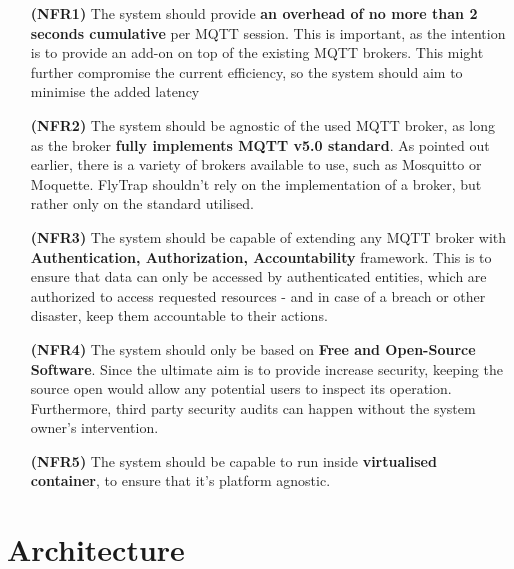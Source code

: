 \begin{itemize}[leftmargin=4.5em]
\item[\textbf{(NFR1)}] The system should provide \textbf{an overhead of no more than 2 seconds cumulative} per MQTT session. This is important, as the intention is to provide an add-on on top of the existing MQTT brokers. This might further compromise the current efficiency, so the system should aim to minimise the added latency 
\item[\textbf{(NFR2)}] The system should be agnostic of the used MQTT broker, as long as the broker \textbf{fully implements MQTT v5.0 standard}. As pointed out earlier, there is a variety of brokers available to use, such as Mosquitto or Moquette. FlyTrap shouldn't rely on the implementation of a broker, but rather only on the standard utilised.
\item[\textbf{(NFR3)}] The system should be capable of extending any MQTT broker with \textbf{Authentication, Authorization, Accountability} framework. This is to ensure that data can only be accessed by authenticated entities, which are authorized to access requested resources - and in case of a breach or other disaster, keep them accountable to their actions.
\item[\textbf{(NFR4)}] The system should only be based on \textbf{Free and Open-Source Software}. Since the ultimate aim is to provide increase security, keeping the source open would allow any potential users to inspect its operation. Furthermore, third party security audits can happen without the system owner's intervention.
\item[\textbf{(NFR5)}] The system should be capable to run inside \textbf{virtualised container}, to ensure that it's platform agnostic.
\end{itemize}

\section{Architecture}

